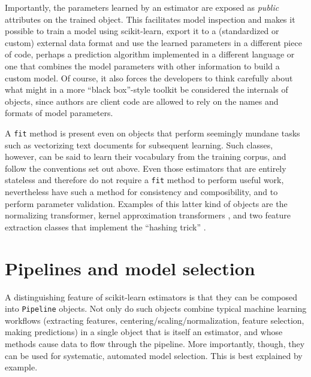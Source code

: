 \documentclass[a4paper]{article}
\begin{document}
Importantly, the parameters learned by an estimator
are exposed as \textit{public} attributes on the trained object.
This facilitates model inspection
and makes it possible to train a model using scikit-learn,
export it to a (standardized or custom) external data format
and use the learned parameters in a different piece of code,
perhaps a prediction algorithm implemented in a different language
or one that combines the model parameters with other information
to build a custom model.
Of course, it also forces the developers to think carefully
about what might in a more ``black box''-style toolkit
be considered the internals of objects,
since authors are client code are allowed to rely
on the names and formats of model parameters.

A \texttt{fit} method is present even on objects
that perform seemingly mundane tasks such as vectorizing text documents
for subsequent learning.
Such classes, however, can be said to learn their vocabulary
from the training corpus,
and follow the conventions set out above.
Even those estimators that are entirely stateless and therefore
do not require a \texttt{fit} method to perform useful work,
nevertheless have such a method for consistency and composibility,
and to perform parameter validation.
Examples of this latter kind of objects are the normalizing transformer,
kernel approximation transformers
\citep{rahimi2007random, li2010random, vedaldi2010efficient},
and two feature extraction classes that implement the ``hashing trick''
\citep{weinberger2009}.

\section{Pipelines and model selection}

A distinguishing feature of scikit-learn estimators
is that they can be composed into \texttt{Pipeline} objects.
Not only do such objects combine typical machine learning workflows
(extracting features, centering/scaling/normalization,
feature selection, making predictions)
in a single object that is itself an estimator,
and whose methods cause data to flow through the pipeline.
More importantly, though, they can be used for
systematic, automated model selection.
This is best explained by example.
\end{document}
